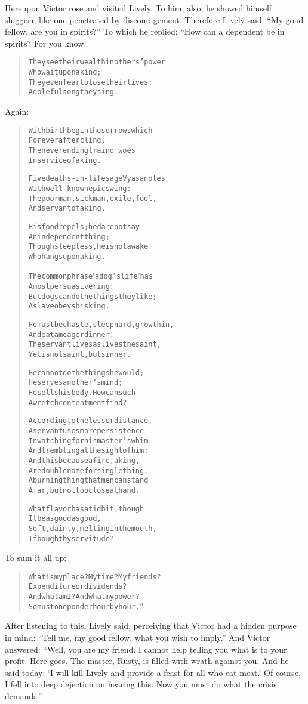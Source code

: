 \documentclass[article, twoside, 14pt]{memoir}
\renewenvironment{verbatim}{%
\begin{quote}%
\vskip -10pt%
\begin{alltt}\normalfont\large}{\end{alltt}%
\end{quote}%
\vskip -10pt
} %
\begin{document}
Hereupon Victor rose and visited Lively. To him, also, he showed
himself sluggish, like one penetrated by discouragement. Therefore
Lively said: ``My good fellow, are you in spirits?'' To which he
replied: “How can a dependent be in spirits? For you know

\begin{verbatim}
They see their wealth in others' power
    Who wait upon a king;
They even fear to lose their lives:
    A doleful song they sing.
\end{verbatim}
Again:

\begin{verbatim}
With birth begin the sorrows which
    Forever after cling,
The never ending train of woes
    In service of a king.

Five deaths-in-life sage Vyasa notes
    With well-known epic swing:
The poor man, sick man, exile, fool,
    And servant of a king.

His food repels; he dare not say
    An independent thing;
Though sleepless, he is not awake
    Who hangs upon a king.

The common phrase ‘a dog's life’ has
    A most persuasive ring:
But dogs can do the things they like;
    A slave obeys his king.

He must be chaste, sleep hard, grow thin,
    And eat a meager dinner:
The servant lives as lives the saint,
    Yet is not saint, but sinner.

He cannot do the things he would;
    He serves another's mind;
He sells his body. How can such
    A wretch contentment find?

According to the lesser distance,
A servant uses more persistence
In watching for his master's whim
And trembling at the sight of him:
And this because a fire, a king,
Are double name for single thing,
A burning thing that men can stand
Afar, but not too close at hand.

What flavor has a tidbit, though
    It be as good as good,
Soft, dainty, melting in the mouth,
    If bought by servitude?
\end{verbatim}
To sum it all up:

\begin{verbatim}
What is my place? My time? My friends?
Expenditure or dividends?
And what am I? And what my power?
So must one ponder hour by hour.”
\end{verbatim}
After listening to this, Lively said, perceiving that Victor had a
hidden purpose in mind:
``Tell me, my good fellow, what you wish to imply.'' And Victor
answered:
``Well, you are my friend. I cannot help telling you what is to your profit. Here goes. The master, Rusty, is filled with wrath against you. And he said today: `I will kill Lively and provide a feast for all who eat meat.' Of course, I fell into deep dejection on hearing this. Now you must do what the crisis demands.''
\end{document}
